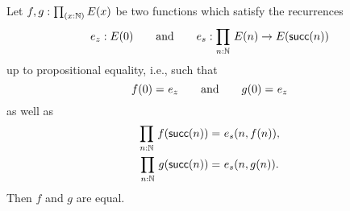 \documentclass[hott-all.tex]{subfiles}
\begin{document}
% 
% 
% 
\begin{thm}
Let $f,g : \prd{x:\nat} E(x)$ be two functions which satisfy the recurrences
%
\begin{equation*}
  e_z : E(0)
  \qquad\text{and}\qquad
  e_s : \prd{n : \nat} E(n) \to E(\suc(n))
\end{equation*}
%
up to propositional equality, i.e., such that
\begin{equation*}
  f(0) =_{} e_z
  \qquad\text{and}\qquad
  g(0) =_{} e_z
\end{equation*}
as well as
\begin{gather*}
  \prd{n : \nat} \id{f(\suc(n))}{e_s(n, f(n))},\\
  \prd{n : \nat} \id{g(\suc(n))}{e_s(n, g(n))}.
\end{gather*}
Then $f$ and $g$ are equal.
\end{thm}
\end{document}
